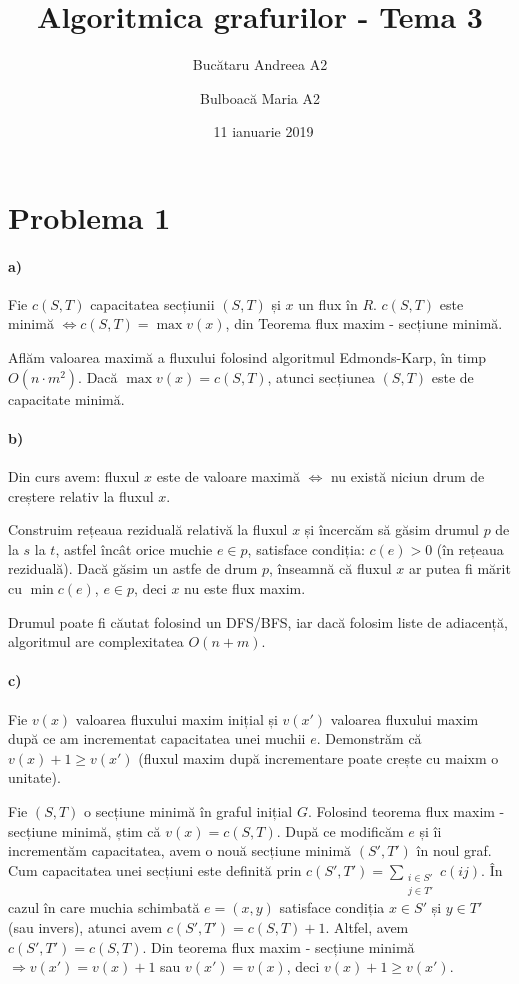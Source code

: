 \documentclass[paper=a4, fontsize=12pt]{scrartcl}
\title{\textbf{Algoritmica grafurilor - Tema 3}}
\author{Bucătaru Andreea A2 \and Bulboacă Maria A2}
\date{\normalsize\ 11 ianuarie 2019}
\begin{document}
\maketitle

\section*{Problema 1}
\paragraph{a)}
Fie $c(S,T)$ capacitatea secțiunii $(S,T)$ și $x$ un flux în $R$. $c(S,T)$ este minimă $\Leftrightarrow c(S,T) = \max v(x)$, 
din Teorema flux maxim - secțiune minimă.

Aflăm valoarea maximă a fluxului folosind algoritmul Edmonds-Karp, în timp $O(n \cdot m^2)$. Dacă $\max v(x) = c(S,T)$,
atunci secțiunea $(S,T)$ este de capacitate minimă.

\paragraph{b)}
Din curs avem: fluxul $x$ este de valoare maximă $\Leftrightarrow$ nu există niciun drum de creștere relativ la fluxul $x$.

Construim rețeaua reziduală relativă la fluxul $x$ și încercăm să găsim drumul $p$ de la $s$ la $t$, astfel încât orice
muchie $e \in p$, satisface condiția: $c(e) > 0$ (în rețeaua reziduală). Dacă găsim un astfe de drum $p$,
înseamnă că fluxul $x$ ar putea fi mărit cu $\min c(e)$, $e \in p$, deci $x$ nu este flux maxim. 

Drumul poate fi căutat folosind un DFS/BFS, iar dacă folosim liste de adiacență, algoritmul are complexitatea $O(n+m)$.

\paragraph{c)}
Fie $v(x)$ valoarea fluxului maxim inițial și $v(x')$ valoarea fluxului maxim după ce am incrementat capacitatea unei muchii
$e$. Demonstrăm că $v(x)+1 \ge v(x')$ (fluxul maxim după incrementare poate crește cu maixm o unitate).

Fie $(S,T)$ o secțiune minimă în graful inițial $G$. Folosind teorema flux maxim - secțiune minimă, știm că $v(x) = c(S,T)$. 
După ce modificăm $e$ și îi incrementăm capacitatea, avem o nouă secțiune minimă $(S',T')$ în noul graf. Cum capacitatea unei secțiuni 
este definită prin $c(S',T') = \displaystyle\sum_{\substack{i \in S' \\ j \in T'}} c(ij)$. În cazul în care muchia schimbată $e = (x,y)$
satisface condiția $x \in S'$ și $y \in T'$ (sau invers), atunci avem $c(S',T') = c(S,T)+1$. Altfel, avem $c(S',T') = c(S,T)$. Din teorema 
flux maxim - secțiune minimă $\Rightarrow v(x') = v(x) + 1$ sau $v(x') = v(x)$, deci $v(x)+1 \ge v(x')$.
\end{document}
